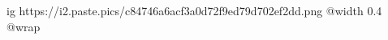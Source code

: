 
 
 
 
 

\ifcmt
  ig https://i2.paste.pics/c84746a6acf3a0d72f9ed79d702ef2dd.png
  @width 0.4
  @wrap 
\fi
